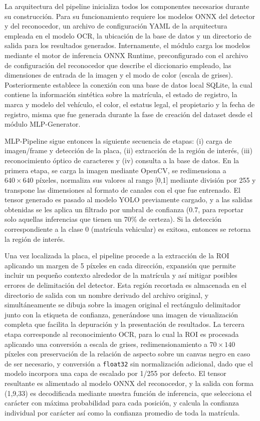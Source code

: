La arquitectura del pipeline inicializa todos los componentes necesarios durante su construcción. Para su funcionamiento requiere los modelos ONNX del detector y del reconocedor, un archivo de configuración YAML de la arquitectura empleada en el modelo OCR, la ubicación de la base de datos y un directorio de salida para los resultados generados. Internamente, el módulo carga los modelos mediante el motor de inferencia ONNX Runtime, preconfigurado con el archivo de configuración del reconocedor que describe el diccionario empleado, las dimensiones de entrada de la imagen y el modo de color (escala de grises). Posteriormente establece la conexión con una base de datos local SQLite, la cual contiene la información sintética sobre la matrícula, el estado de registro, la marca y modelo del vehículo, el color, el estatus legal, el propietario y la fecha de registro, misma que fue generada durante la fase de creación del dataset desde el módulo MLP-Generator.

MLP-Pipeline sigue entonces la siguiente secuencia de etapas: (i) carga de imagen/frame y detección de la placa, (ii) extracción de la región de interés, (iii) reconocimiento óptico de caracteres y (iv) consulta a la base de datos. En la primera etapa, se carga la imagen mediante OpenCV, se redimensiona a $640\times 640$ píxeles, normaliza sus valores al rango [0,1] mediante división por 255 y transpone las dimensiones al formato de canales con el que fue entrenado. El tensor generado es pasado al modelo YOLO previamente cargado, y a las salidas obtenidas se les aplica un filtrado por umbral de confianza (0.7, para reportar solo aquellas inferencias que tienen un 70\% de certeza). Si la detección correspondiente a la clase 0 (matrícula vehicular) es exitosa, entonces se retorna la región de interés.

Una vez localizada la placa, el pipeline procede a la extracción de la ROI aplicando un margen de 5 píxeles en cada dirección, expansión que permite incluir un pequeño contexto alrededor de la matrícula y así mitigar posibles errores de delimitación del detector. Esta región recortada es almacenada en el directorio de salida con un nombre derivado del archivo original, y simultáneamente se dibuja sobre la imagen original el rectángulo delimitador junto con la etiqueta de confianza, generándose una imagen de visualización completa que facilita la depuración y la presentación de resultados. La tercera etapa corresponde al reconocimiento OCR, para lo cual la ROI es procesada aplicando una conversión a escala de grises, redimensionamiento a $70 \times 140$ píxeles con preservación de la relación de aspecto sobre un canvas negro en caso de ser necesario, y conversión a \texttt{float32} sin normalización adicional, dado que el modelo incorpora una capa de escalado por 1/255 por defecto. El tensor resultante es alimentado al modelo ONNX del reconocedor, y la salida con forma (1,9,33) es decodificada mediante nuestra función de inferencia, que selecciona el carácter con máxima probabilidad para cada posición, y calcula la confianza individual por carácter así como la confianza promedio de toda la matrícula.

